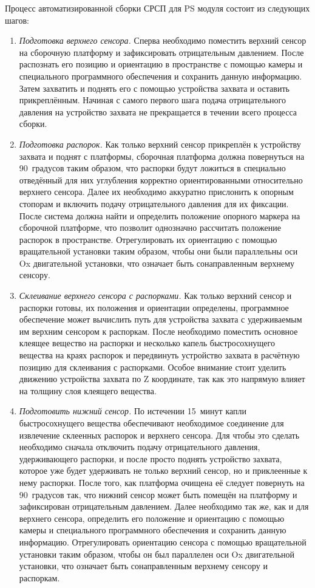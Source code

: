 Процесс автоматизированной сборки СРСП для PS модуля состоит из следующих шагов:

\begin{enumerate}
\setlength\itemsep{-0.5em}
\item \emph{Подготовка верхнего сенсора.} Сперва необходимо поместить верхний сенсор на сборочную платформу и зафиксировать отрицательным давлением. После распознать его позицию и ориентацию в пространстве с помощью камеры и специального программного обеспечения и сохранить данную информацию. Затем захватить и поднять его с помощью устройства захвата и оставить прикреплённым. Начиная с самого первого шага подача отрицательного давления на устройство захвата не прекращается в течении всего процесса сборки.
\item \emph{Подготовка распорок.} Как только верхний сенсор прикреплён к устройству захвата и поднят с платформы, сборочная платформа должна повернуться на 90~градусов таким образом, что распорки будут ложиться в специально отведённый для них углубления корректно ориентированными относительно верхнего сенсора. Далее их необходимо аккуратно прислонить к опорным стопорам и включить подачу отрицательного давления для их фиксации. После система должна найти и определить положение опорного маркера на сборочной платформе, что позволит однозначно рассчитать положение распорок в пространстве. Отрегулировать их ориентацию с помощью вращательной установки таким образом, чтобы они были параллельны оси Ox двигательной установки, что означает быть сонаправленным верхнему сенсору.
\item \emph{Склеивание верхнего сенсора с распорками.} Как только верхний сенсор и распорки готовы, их положения и ориентации определены, программное обеспечение может вычислить путь для устройства захвата с удерживаемым им верхним сенсором к распоркам. После необходимо поместить основное клеящее вещество на распорки и несколько капель быстросохнущего вещества на краях распорок и передвинуть устройство захвата в расчётную позицию для склеивания с распорками. Особое внимание стоит уделить движению устройства захвата по Z координате, так как это напрямую влияет на толщину слоя клеящего вещества.
\item \emph{Подготовить нижний сенсор.} По истечении 15~минут капли быстросохнущего вещества обеспечивают необходимое соединение для извлечение склеенных распорок и верхнего сенсора. Для чтобы это сделать необходимо сначала отключить подачу отрицательного давления, удерживающего распорки, и после просто поднять устройство захвата, которое уже будет удерживать не только верхний сенсор, но и приклеенные к нему распорки. После того, как платформа очищена её следует повернуть на 90~градусов так, что нижний сенсор может быть помещён на платформу и зафиксирован отрицательным давлением. Далее необходимо так же, как и для верхнего сенсора, определить его положение и ориентацию с помощью камеры и специального программного обеспечения и сохранить данную информацию. Отрегулировать ориентацию сенсора с помощью вращательной установки таким образом, чтобы он был параллелен оси Ox двигательной установки, что означает быть сонаправленным верхнему сенсору и распоркам.

\end{enumerate}
